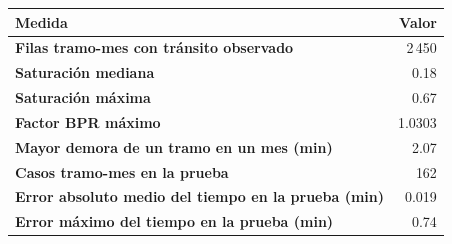 \renewcommand{\arraystretch}{1.2}
\begin{tabular}{|l|r|}
\hline
\rowcolor{gray!20} \textbf{Medida} & \textbf{Valor} \\
\hline
\textbf{Filas tramo-mes con tránsito observado} & 2\,450 \\
\hline
\textbf{Saturación mediana} & 0.18 \\
\hline
\textbf{Saturación máxima} & 0.67 \\
\hline
\textbf{Factor BPR máximo} & 1.0303 \\
\hline
\textbf{Mayor demora de un tramo en un mes (min)} & 2.07 \\
\hline
\textbf{Casos tramo-mes en la prueba} & 162 \\
\hline
\textbf{Error absoluto medio del tiempo en la prueba (min)} & 0.019 \\
\hline
\textbf{Error máximo del tiempo en la prueba (min)} & 0.74 \\
\hline
\end{tabular}
